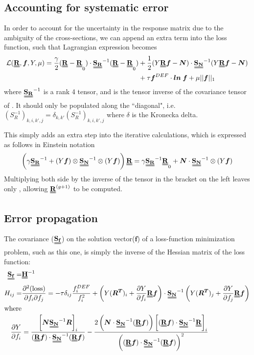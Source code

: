 \documentclass[a4paper, 12pt]{article}
\newcommand{\matr}[1]{\uuline{\bf{#1}}}
\newcommand{\ve}[1]{\boldsymbol{#1}}
\newcommand{\covarN}{\matr{S_N}^{-1}}
\newcommand{\covarR}{\matr{S_R}^{-1}}
\newcommand{\tens}{\mathbin{\mathop{\otimes}}}
\begin{document}
\subsection{Accounting for systematic error}\label{Accounting for systematic error}
    In order to account for the uncertainty in the response matrix due to the ambiguity of the cross-sections, we can append an extra term into the loss function, such that Lagrangian expression becomes
    \begin{align*}
    \mathcal{L}(\matr{R}, \ve{f}, Y, \mu) =  \frac{\gamma}{2}(\matr{R}-\matr{R}_0)\cdot\covarR(\matr{R}-\matr{R}_0)&+\frac{1}{2}(Y\matr{R}\ve{f} - \ve{N})\cdot\covarN(Y\matr{R}\ve{f} - \ve{N})
    \\&+ \tau \ve{f}^{DEF}\cdot\ve{ln\:f}+\mu||\ve{f}||_1
    \end{align*}
where $\covarR$ is a rank 4 tensor, and is the tensor inverse of the covariance tensor of \matr{R}. It should only be populated along the ``diagonal", i.e. $ (S_R^{-1})_{k,i,k',j}=\delta_{k,k'} (S_R^{-1})_{k,i,k',j}$ where $\delta$ is the Kronecka delta.

This simply adds an extra step into the iterative calculations, which is expressed as follows in Einstein notation 
\begin{align}
    \left(\gamma \covarR + (Y\ve{f})\tens\covarN\tens(Y\ve{f}) \right)\matr{R} = \gamma\covarR\matr{R}_0 + \ve{N}\cdot \covarN \tens (Y\ve{f})
\end{align}
Multiplying both side by the inverse of the tensor in the bracket on the left leaves only \matr{R}, allowing $\matr{R}^{(g+1)}$ to be computed.
\subsection{Error propagation}\label{Error propagation}
    The covariance ($\matr{S_f}$) on the solution vector($\ve{f}$) of a loss-function minimization problem, such as this one, is simply the inverse of the Hessian matrix of the loss function:
    \begin{align*}
        \matr{S_f}=& \matr{H}^{-1}\\
    H_{ij} =& \frac{\partial^2 (\text{loss})}{\partial f_i \partial f_j}
        = -\tau \delta_{ij}\frac{f^{DEF}_i}{f_i^2} + \left(Y(\ve{R^T})_i+ \frac{\partial Y}{\partial f_i} \matr{R}\ve{f} \right)\cdot\covarN\left(Y(\ve{R^T})_j+ \frac{\partial Y}{\partial f_j} \matr{R}\ve{f} \right)\\
    \intertext{where}
        \frac{\partial Y}{\partial f_i} &= \frac{\left[\ve{N}\covarN\ve{R} \right]_i} {(\matr{R}\ve{f})\cdot\covarN(\matr{R}\ve{f})} - \frac{ 2 \left(\ve{N}\cdot\covarN(\matr{R}\ve{f})\right) \left[(\matr{R}\ve{f})\cdot\covarN\matr{R}\right]_i} {\left((\matr{R}\ve{f})\cdot\covarN(\matr{R}\ve{f})\right)^2}
    \end{align*}
\end{document}
